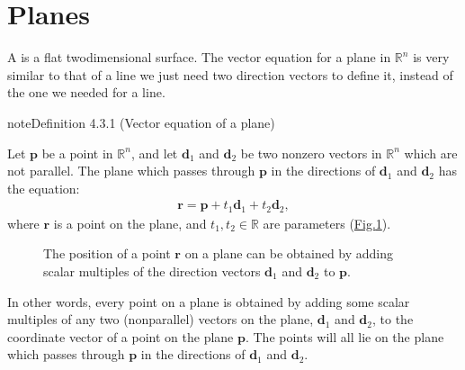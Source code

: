 \documentclass[letterpaper,10pt,english]{jupyterBook}
\let\sphinxpxdimen\pdfpxdimen\else\newdimen\sphinxpxdimen
\begin{document}
\section{Planes}
\label{\detokenize{_pages/4.2_Planes:planes}}\label{\detokenize{_pages/4.2_Planes:index-0}}\label{\detokenize{_pages/4.2_Planes:planes-section}}\label{\detokenize{_pages/4.2_Planes::doc}}
\sphinxAtStartPar
A  is a flat two\sphinxhyphen{}dimensional surface. The vector equation for a plane in \(\mathbb{R}^n\) is very similar to that of a line \sphinxhyphen{} we just need two direction vectors to define it, instead of the one we needed for a line.
\label{_pages/4.2_Planes:plane-vector-equation}
\begin{sphinxadmonition}{note}{Definition 4.3.1 (Vector equation of a plane)}



\sphinxAtStartPar
Let \(\mathbf{p}\) be a point in \(\mathbb{R}^n\), and let \(\mathbf{d}_1\) and \(\mathbf{d}_2\) be two non\sphinxhyphen{}zero vectors in \(\mathbb{R}^n\) which are not parallel. The plane which passes through \(\mathbf{p}\) in the directions of \(\mathbf{d}_1\) and \(\mathbf{d}_2\) has the equation:
\begin{equation*}
\begin{split} \mathbf{r} = \mathbf{p} + t_1 \mathbf{d}_1 + t_2 \mathbf{d}_2, \end{split}
\end{equation*}
\sphinxAtStartPar
where \(\mathbf{r}\) is a point on the plane, and \(t_1,t_2 \in \mathbb{R}\) are parameters (\hyperref[\detokenize{_pages/4.2_Planes:plane-1-figure}]{Fig.\@ \ref{\detokenize{_pages/4.2_Planes:plane-1-figure}}}).

\begin{figure}[htbp]
\centering
\capstart

\noindent\sphinxincludegraphics[width=400\sphinxpxdimen]{{4_plane}.svg}
\caption{The position of a point \(\mathbf{r}\) on a plane can be obtained by adding scalar multiples of the direction vectors \(\mathbf{d}_1\) and \(\mathbf{d}_2\) to \(\mathbf{p}\).}\label{\detokenize{_pages/4.2_Planes:plane-1-figure}}\end{figure}
\end{sphinxadmonition}

\sphinxAtStartPar
In other words, every point on a plane is obtained by adding some scalar multiples of any two (non\sphinxhyphen{}parallel) vectors on the plane, \(\mathbf{d}_1\) and \(\mathbf{d}_2\), to the coordinate vector of a point on the plane \(\mathbf{p}\). The points will all lie on the plane which passes through \(\mathbf{p}\) in the directions of \(\mathbf{d}_1\) and \(\mathbf{d}_2\).
\end{document}
